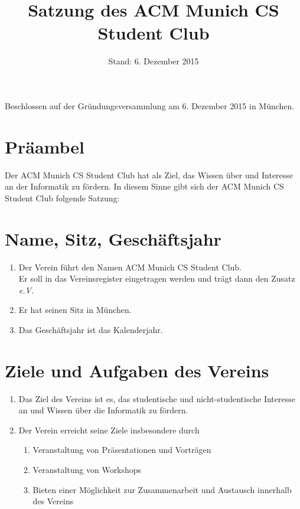 \documentclass{article}
\title{Satzung des ACM Munich CS Student Club}
\date{Stand: 6. Dezember 2015}
\begin{document}
\newcommand{\zit}[2]{"#1"\footnote{#2}}
\newcommand{\einf}[2]{\center{"#1"}.\arabic{subsection}}
\maketitle

\begin{center}
Beschlossen auf der Gründungsversammlung am 6. Dezember 2015 in München.
\end{center}



\section*{Präambel}
\label{sec:praeambel}
Der ACM Munich CS Student Club hat als Ziel, das Wissen über und Interesse an der Informatik zu fördern.
In diesem Sinne gibt sich der ACM Munich CS Student Club folgende Satzung:

\section{Name, Sitz, Geschäftsjahr}
\label{sec:namesitz}
\begin{enumerate}
\item Der Verein führt den Namen ACM Munich CS Student Club.\\
Er soll in das Vereinsregister eingetragen werden und trägt dann den Zusatz \textit{e.V.}

\item Er hat seinen Sitz in München.

\item Das Geschäftsjahr ist das Kalenderjahr.
\end{enumerate}

\section{Ziele und Aufgaben des Vereins}
\label{sec:ziele}
\begin{enumerate}
\item Das Ziel des Vereins ist es, das studentische und nicht-studentische Interesse an und Wissen über die Informatik zu fördern.
\item Der Verein erreicht seine Ziele insbesondere durch
\begin{enumerate}
\item Veranstaltung von Präsentationen und Vorträgen
\item Veranstaltung von Workshops
\item Bieten einer Möglichkeit zur Zusammenarbeit und Austausch innerhalb des Vereins
\end{enumerate}
  
\end{enumerate}
  
\end{document}
